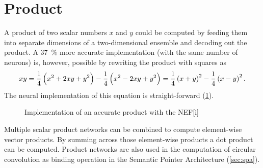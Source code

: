 \section{Product}\label{sec:product}
A product of two scalar numbers $x$ and $y$ could be computed by feeding them into separate dimensions of a two-dimensional ensemble and decoding out the product.
A \SI{37}{\percent} more accurate implementation (with the same number of neurons) is, however, possible \parencite{gosmann2015-1} by rewriting the product with squares as
\begin{equation}
    xy = \frac{1}{4}\del{x^2 + 2xy + y^2} - \frac{1}{4}\del{x^2 - 2xy + y^2} = \frac{1}{4}\del{x + y}^2 - \frac{1}{4}\del{x - y}^2 \text{.}
\end{equation}
The neural implementation of this equation is straight-forward (\cref{fig:product-net}).
\begin{figure}
    \begin{captionbeside}{Implementation of an accurate product with the NEF}[i]
    \end{captionbeside}\label{fig:product-net}
\end{figure}

Multiple scalar product networks can be combined to compute element-wise vector products.
By summing across those element-wise products a dot product can be computed.
Product networks are also used in the computation of circular convolution as binding operation in the Semantic Pointer Architecture (\cref{sec:spa}).
